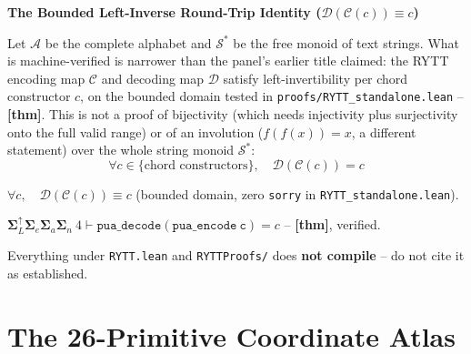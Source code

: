 \documentclass[10pt,oneside,letterpaper]{article}
\newcommand{\rosettapanel}[3]{%
  \begin{mdframed}[linecolor=gold, linewidth=0.8pt, backgroundcolor=panel, fontcolor=ink, innerleftmargin=8pt, innerrightmargin=8pt, innertopmargin=6pt, innerbottommargin=6pt, skipabove=6pt, skipbelow=6pt, roundcorner=2pt]
    {\bfseries\color{gold} #1}\par\vspace{0.2em}
    \begin{minipage}[t]{0.48\textwidth}
      \small\color{ink} #2
    \end{minipage}\hfill%
    \begin{minipage}[t]{0.48\textwidth}
      \small\ttfamily\color{cyan} #3
    \end{minipage}
  \end{mdframed}
}
\begin{document}
\rosettapanel{The Bounded Left-Inverse Round-Trip Identity ($\mathcal{D}(\mathcal{C}(c)) \equiv c$)}{%
Let $\mathcal{A}$ be the complete alphabet and $\mathcal{S}^*$ be the free monoid of text strings. What is machine-verified is narrower than the panel's earlier title claimed: the RYTT encoding map $\mathcal{C}$ and decoding map $\mathcal{D}$ satisfy left-invertibility per chord constructor $c$, on the bounded domain tested in \texttt{proofs/RYTT\_standalone.lean} -- \textbf{[thm]}. This is not a proof of bijectivity (which needs injectivity plus surjectivity onto the full valid range) or of an involution ($f(f(x))=x$, a different statement) over the whole string monoid $\mathcal{S}^*$:
$$\forall c \in \{\text{chord constructors}\},\quad \mathcal{D}(\mathcal{C}(c)) = c$$
}{%
$\forall c,\quad \mathcal{D}(\mathcal{C}(c)) \equiv c$ (bounded domain, zero \texttt{sorry} in \texttt{RYTT\_standalone.lean}).\par
$\mathbf{\Sigma}^\uparrow_L \mathbf{\Sigma}_e \mathbf{\Sigma}_a \mathbf{\Sigma}_n~4 \vdash \mathtt{pua\_decode(pua\_encode~c)} = c$ -- \textbf{[thm]}, verified.\par
Everything under \texttt{RYTT.lean} and \texttt{RYTTProofs/} does \textbf{not compile} -- do not cite it as established.
}

\section{The 26-Primitive Coordinate Atlas}
\end{document}
